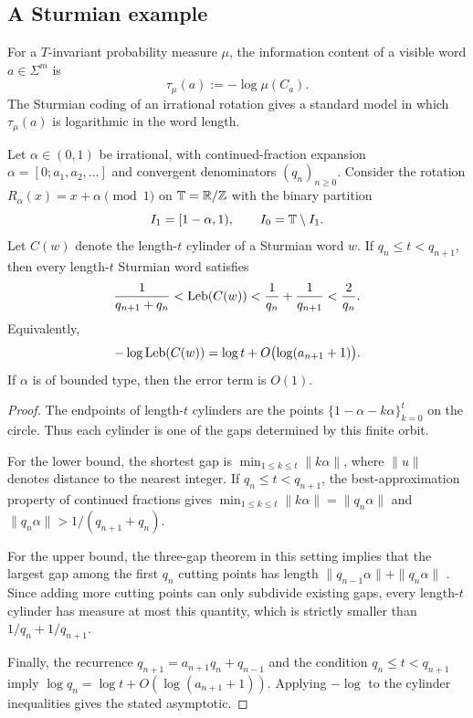 \subsection{A Sturmian example}

For a \(T\)-invariant probability measure \(\mu\), the information
content of a visible word \(a\in\Sigma^m\) is
\[
  \tau_\mu(a):=-\log\mu(C_a).
\]
The Sturmian coding of an irrational rotation gives a standard model in
which \(\tau_\mu(a)\) is logarithmic in the word length.

\begin{theorem}\label{thm:sturmian-cylinder-sandwich}
Let $\alpha\in(0,1)$ be irrational, with continued-fraction expansion
$\alpha=[0;a_1,a_2,\ldots]$ and convergent denominators $(q_n)_{n\ge 0}$.
Consider the rotation $R_\alpha(x)=x+\alpha\pmod 1$ on
$\mathbb{T}=\mathbb{R}/\mathbb{Z}$ with the binary partition
\[
  I_1=[1-\alpha,1),
  \qquad
  I_0=\mathbb{T}\setminus I_1.
\]
Let $C(w)$ denote the length-$t$ cylinder of a Sturmian word $w$.
If $q_n\le t<q_{n+1}$, then every length-$t$ Sturmian word satisfies
\[
  \frac{1}{q_{n+1}+q_n}
  < \mathrm{Leb}(C(w))
  < \frac{1}{q_n}+\frac{1}{q_{n+1}}
  < \frac{2}{q_n}.
\]
Equivalently,
\[
  -\log\mathrm{Leb}(C(w))=\log t+O\bigl(\log(a_{n+1}+1)\bigr).
\]
If $\alpha$ is of bounded type, then the error term is $O(1)$.
\end{theorem}

\begin{proof}
The endpoints of length-$t$ cylinders are the points
$\{1-\alpha-k\alpha\}_{k=0}^{t}$ on the circle. Thus each cylinder is one of
the gaps determined by this finite orbit.

For the lower bound, the shortest gap is
$\min_{1\le k\le t}\|k\alpha\|$, where $\|u\|$ denotes distance to the nearest
integer. If $q_n\le t<q_{n+1}$, the best-approximation property of continued
fractions gives
$\min_{1\le k\le t}\|k\alpha\|=\|q_n\alpha\|$ and
$\|q_n\alpha\|>1/(q_{n+1}+q_n)$.

For the upper bound, the three-gap theorem in this setting implies that the
largest gap among the first $q_n$ cutting points has length
$\|q_{n-1}\alpha\|+\|q_n\alpha\|$
\cite{Slater1950DistributionIntegers,Slater1967GapsSteps}. Since adding more
cutting points can only subdivide existing gaps, every length-$t$ cylinder has
measure at most this quantity, which is strictly smaller than
$1/q_n+1/q_{n+1}$.

Finally, the recurrence $q_{n+1}=a_{n+1}q_n+q_{n-1}$ and the condition
$q_n\le t<q_{n+1}$ imply
$\log q_n=\log t+O(\log(a_{n+1}+1))$.
Applying $-\log$ to the cylinder inequalities gives the stated asymptotic.
\end{proof}

